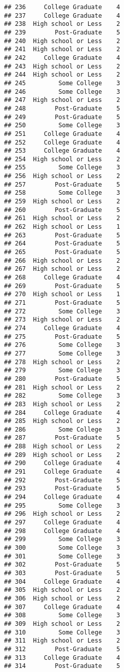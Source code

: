 \documentclass[
]{article}
\begin{document}
\begin{verbatim}
## 236     College Graduate    4
## 237     College Graduate    4
## 238  High school or Less    2
## 239        Post-Graduate    5
## 240  High school or Less    2
## 241  High school or Less    2
## 242     College Graduate    4
## 243  High school or Less    2
## 244  High school or Less    2
## 245         Some College    3
## 246         Some College    3
## 247  High school or Less    2
## 248        Post-Graduate    5
## 249        Post-Graduate    5
## 250         Some College    3
## 251     College Graduate    4
## 252     College Graduate    4
## 253     College Graduate    4
## 254  High school or Less    2
## 255         Some College    3
## 256  High school or Less    2
## 257        Post-Graduate    5
## 258         Some College    3
## 259  High school or Less    2
## 260        Post-Graduate    5
## 261  High school or Less    2
## 262  High school or Less    1
## 263        Post-Graduate    5
## 264        Post-Graduate    5
## 265        Post-Graduate    5
## 266  High school or Less    2
## 267  High school or Less    2
## 268     College Graduate    4
## 269        Post-Graduate    5
## 270  High school or Less    1
## 271        Post-Graduate    5
## 272         Some College    3
## 273  High school or Less    2
## 274     College Graduate    4
## 275        Post-Graduate    5
## 276         Some College    3
## 277         Some College    3
## 278  High school or Less    2
## 279         Some College    3
## 280        Post-Graduate    5
## 281  High school or Less    2
## 282         Some College    3
## 283  High school or Less    2
## 284     College Graduate    4
## 285  High school or Less    2
## 286         Some College    3
## 287        Post-Graduate    5
## 288  High school or Less    2
## 289  High school or Less    2
## 290     College Graduate    4
## 291     College Graduate    4
## 292        Post-Graduate    5
## 293        Post-Graduate    5
## 294     College Graduate    4
## 295         Some College    3
## 296  High school or Less    2
## 297     College Graduate    4
## 298     College Graduate    4
## 299         Some College    3
## 300         Some College    3
## 301         Some College    3
## 302        Post-Graduate    5
## 303        Post-Graduate    5
## 304     College Graduate    4
## 305  High school or Less    2
## 306  High school or Less    2
## 307     College Graduate    4
## 308         Some College    3
## 309  High school or Less    2
## 310         Some College    3
## 311  High school or Less    2
## 312        Post-Graduate    5
## 313     College Graduate    4
## 314        Post-Graduate    5

\end{verbatim}
\end{document}

